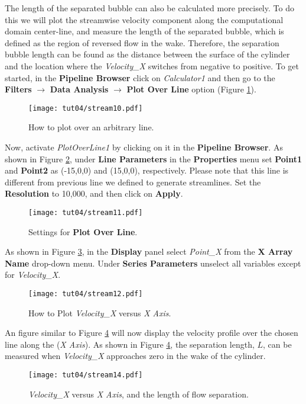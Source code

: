 The length of the separated bubble can also be calculated more precisely. To do this we will plot the streamwise velocity component along the computational domain center-line, and measure the length of the separated bubble, which is defined as the region of reversed flow in the wake. Therefore, the separation bubble length can be found as the distance between the surface of the cylinder and the location where the \textit{Velocity\_X} switches from negative to positive. To get started, in the \textbf{Pipeline Browser} click on \textit{Calculator1} and then go to the \textbf{Filters} $\rightarrow$ \textbf{Data Analysis} $\rightarrow$ \textbf{Plot Over Line} option (Figure \ref{fig4:stream10_4}).
\begin{figure}[htbp]
    \centering
    \texttt{[image: tut04/stream10.pdf]}
    \caption{How to plot over an arbitrary line.}
    \label{fig4:stream10_4}
\end{figure}
Now, activate \textit{PlotOverLine1} by clicking on it in the \textbf{Pipeline Browser}. As shown in Figure \ref{fig4:stream11_4}, under \textbf{Line Parameters} in the \textbf{Properties} menu set \textbf{Point1} and \textbf{Point2} as (-15,0,0) and (15,0,0), respectively. Please note that this line is different from previous line we defined to generate streamlines. Set the \textbf{Resolution} to 10,000, and then click on \textbf{Apply}.
\begin{figure}[htbp]
    \centering
    \texttt{[image: tut04/stream11.pdf]}
    \caption{Settings for \textbf{Plot Over Line}.}
    \label{fig4:stream11_4}
\end{figure}
As shown in Figure \ref{fig4:stream12_4}, in the \textbf{Display} panel select \textit{Point\_X} from the \textbf{X Array Name} drop-down menu. Under \textbf{Series Parameters} unselect all variables except for \textit{Velocity\_X}.
\begin{figure}[htbp]
    \centering
    \texttt{[image: tut04/stream12.pdf]}
    \caption{How to Plot \textit{Velocity\_X} versus \textit{X Axis}.}
    \label{fig4:stream12_4}
\end{figure}
An figure similar to Figure \ref{fig4:stream14_4} will now display the velocity profile over the chosen line along the (\textit{X Axis}). As shown in Figure \ref{fig4:stream14_4}, the separation length, $L$, can be measured when \textit{Velocity\_X} approaches zero in the wake of the cylinder.
\begin{figure}[htbp]
    \centering
    \texttt{[image: tut04/stream14.pdf]}
    \caption{\textit{Velocity\_X} versus \textit{X Axis}, and the length of flow separation.}
    \label{fig4:stream14_4}
\end{figure}
